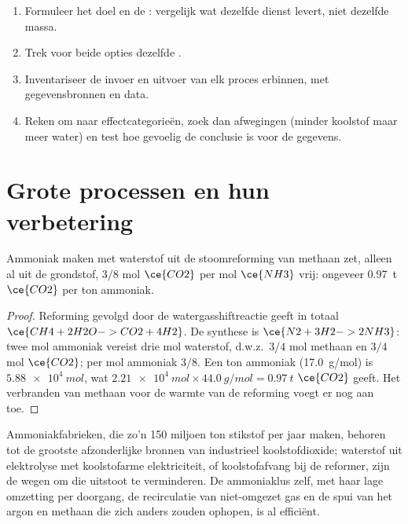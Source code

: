 \begin{method}\label{met:b3:green-industrial:lca}
\begin{enumerate}
  \item Formuleer het doel en de : vergelijk wat
        dezelfde dienst levert, niet dezelfde massa.
  \item Trek voor beide opties dezelfde .
  \item Inventariseer de invoer en uitvoer van elk proces erbinnen, met
        gegevensbronnen en data.
  \item Reken om naar effectcategorieën, zoek dan afwegingen (minder
        koolstof maar meer water) en test hoe gevoelig de conclusie is voor
        de gegevens.
\end{enumerate}
\end{method}

\section{Grote processen en hun verbetering}

\begin{proposition}\label{prop:b3:green-industrial:smr}
Ammoniak maken met waterstof uit de stoomreforming van methaan zet, alleen
al uit de grondstof, $3/8$ mol $\ce{CO2}$ per mol $\ce{NH3}$ vrij: ongeveer \qty{0.97}{t} $\ce{CO2}$ per ton ammoniak.
\end{proposition}

\begin{proof}
Reforming gevolgd door de watergasshiftreactie geeft in totaal $\ce{CH4 + 2H2O -> CO2 + 4H2}$. De synthese
is $\ce{N2 + 3H2 -> 2NH3}$: twee mol ammoniak vereist drie mol waterstof, d.w.z.\ $3/4$ mol
methaan en $3/4$ mol $\ce{CO2}$; per mol ammoniak $3/8$. Een ton ammoniak
(\qty{17.0}{g/mol}) is $\qty{5.88e4}{mol}$, wat $\qty{2.21e4}{mol} \times \qty{44.0}{g/mol} = \qty{0.97}{t}$ $\ce{CO2}$ geeft. Het verbranden van methaan
voor de warmte van de reforming voegt er nog aan toe.
\end{proof}

Ammoniakfabrieken, die zo'n 150 miljoen ton stikstof per jaar maken,
behoren tot de grootste afzonderlijke bronnen van industrieel
koolstofdioxide; waterstof uit elektrolyse met koolstofarme
elektriciteit, of koolstofafvang bij de reformer, zijn de wegen om die
uitstoot te verminderen. De ammoniaklus zelf, met haar lage omzetting
per doorgang, de recirculatie van niet-omgezet gas en de spui van het
argon en methaan die zich anders zouden ophopen, is al efficiënt.

